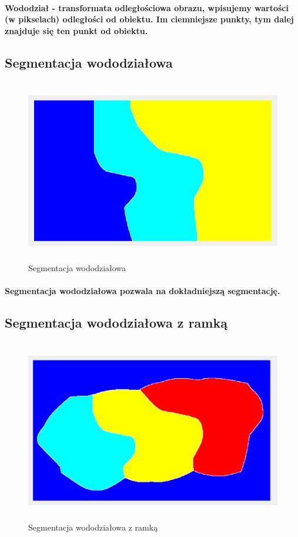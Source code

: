 \documentclass[a4paper,12pt]{article}
\begin{document}
\begin{justify}
\paragraph{Wododział - transformata odległościowa obrazu, wpisujemy wartości (w pikselach) odległości od obiektu. Im ciemniejsze punkty, tym dalej znajduje się ten punkt od obiektu.}

\subsection{Segmentacja wododziałowa}

\begin{figure}[h]
\centering
\includegraphics[width=12cm, height=8cm]{11}
\caption{Segmentacja wododziałowa}
\end{figure}

\paragraph{Segmentacja wododziałowa pozwala na dokładniejszą segmentację.}

\newpage

\subsection{Segmentacja wododziałowa z ramką}

\begin{figure}[h]
\centering
\includegraphics[width=12cm, height=8cm]{12}
\caption{Segmentacja wododziałowa z ramką}
\end{figure}


\end{justify}
\end{document}

